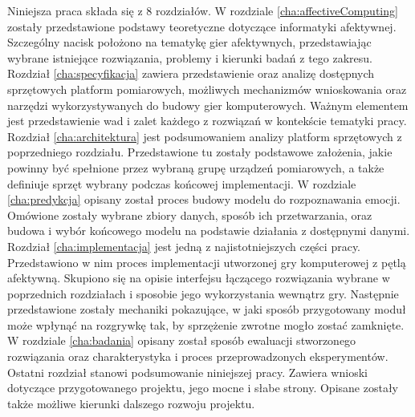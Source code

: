 Niniejsza praca składa się z 8 rozdziałów. W rozdziale \ref{cha:affectiveComputing} zostały przedstawione podstawy teoretyczne dotyczące informatyki afektywnej. Szczególny nacisk położono na tematykę gier afektywnych, przedstawiając wybrane istniejące rozwiązania, problemy i kierunki badań z tego zakresu. Rozdział \ref{cha:specyfikacja} zawiera przedstawienie oraz analizę dostępnych sprzętowych platform pomiarowych, możliwych mechanizmów wnioskowania oraz narzędzi wykorzystywanych do budowy gier komputerowych. Ważnym elementem jest przedstawienie wad i zalet każdego z rozwiązań w kontekście tematyki pracy. Rozdział \ref{cha:architektura} jest podsumowaniem analizy platform sprzętowych z poprzedniego rozdziału. Przedstawione tu zostały podstawowe założenia, jakie powinny być spełnione przez wybraną grupę urządzeń pomiarowych, a także definiuje sprzęt wybrany podczas końcowej implementacji. W rozdziale \ref{cha:predykcja} opisany został proces budowy modelu do rozpoznawania emocji. Omówione zostały wybrane zbiory danych, sposób ich przetwarzania, oraz budowa i wybór końcowego modelu na podstawie działania z dostępnymi danymi. Rozdział \ref{cha:implementacja} jest jedną z najistotniejszych części pracy. Przedstawiono w nim proces implementacji utworzonej gry komputerowej z pętlą afektywną. Skupiono się na opisie interfejsu łączącego rozwiązania wybrane w poprzednich rozdziałach i sposobie jego wykorzystania wewnątrz gry. Następnie przedstawione zostały mechaniki pokazujące, w jaki sposób przygotowany moduł może wpłynąć na rozgrywkę tak, by sprzężenie zwrotne mogło zostać zamknięte. W rozdziale \ref{cha:badania} opisany został sposób ewaluacji stworzonego rozwiązania oraz charakterystyka i proces przeprowadzonych eksperymentów. Ostatni rozdział stanowi podsumowanie niniejszej pracy. Zawiera wnioski dotyczące przygotowanego projektu, jego mocne i słabe strony. Opisane zostały także możliwe kierunki dalszego rozwoju projektu. 
